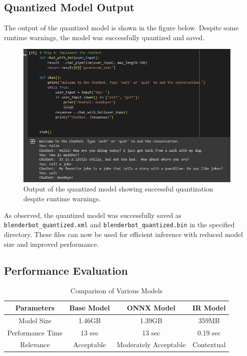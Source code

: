 \documentclass{josis}
\begin{document}
\FloatBarrier
\subsection{Quantized Model Output}
The output of the quantized model is shown in the figure below. Despite some runtime warnings, the model was successfully quantized and saved.

\begin{figure}[H]
    \centering
    \includegraphics[scale=0.5]{2i.jpg}
    \caption{Output of the quantized model showing successful quantization despite runtime warnings.}
    \label{fig:quantized_model_output}
\end{figure}

As observed, the quantized model was successfully saved as \texttt{blenderbot\_quantized.xml} and \texttt{blenderbot\_quantized.bin} in the specified directory. These files can now be used for efficient inference with reduced model size and improved performance.

\subsection{Performance Evaluation}
\begin{table}
  \centering
  \begin{tabular}{|c|c|c|c|}
    \hline
    Parameters & Base Model & ONNX Model & IR Model\\
    \hline
    Model Size & 1.46GB & 1.39GB & 359MB \\
    \hline
    Performance Time & 13 sec & 13 sec & 0.19 sec \\
    \hline
    Relevance & Acceptable & Moderately Acceptable & Contextual\\
    \hline
  \end{tabular}
  \caption{Comparison of Various Models }
  \label{tab:example_table}
\end{table}
\end{document}
